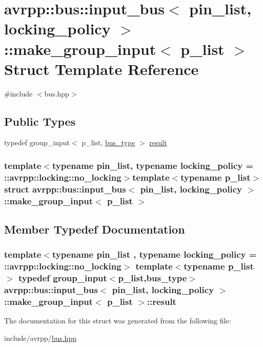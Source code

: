 \hypertarget{structavrpp_1_1bus_1_1input__bus_1_1make__group__input}{
\section{avrpp::bus::input\_\-bus$<$ pin\_\-list, locking\_\-policy $>$::make\_\-group\_\-input$<$ p\_\-list $>$ Struct Template Reference}
\label{structavrpp_1_1bus_1_1input__bus_1_1make__group__input}
}


{\ttfamily \#include $<$bus.hpp$>$}

\subsection*{Public Types}
\begin{DoxyCompactItemize}
\item 
typedef group\_\-input$<$ p\_\-list, \hyperlink{structavrpp_1_1bus_1_1input__bus_aa1146b9861eb713a67224e329e4244a9}{bus\_\-type} $>$ \hyperlink{structavrpp_1_1bus_1_1input__bus_1_1make__group__input_a90aa4faa8b8dcf00d2b176b7f943f260}{result}
\end{DoxyCompactItemize}
\subsubsection*{template$<$typename pin\_\-list, typename locking\_\-policy = ::avrpp::locking::no\_\-locking$>$template$<$typename p\_\-list$>$ struct avrpp::bus::input\_\-bus$<$ pin\_\-list, locking\_\-policy $>$::make\_\-group\_\-input$<$ p\_\-list $>$}



\subsection{Member Typedef Documentation}
\hypertarget{structavrpp_1_1bus_1_1input__bus_1_1make__group__input_a90aa4faa8b8dcf00d2b176b7f943f260}{
\subsubsection[{result}]{\setlength{\rightskip}{0pt plus 5cm}template$<$typename pin\_\-list , typename locking\_\-policy  = ::avrpp::locking::no\_\-locking$>$ template$<$typename p\_\-list $>$ typedef group\_\-input$<$p\_\-list,{\bf bus\_\-type}$>$ {\bf avrpp::bus::input\_\-bus}$<$ pin\_\-list, locking\_\-policy $>$::{\bf make\_\-group\_\-input}$<$ p\_\-list $>$::{\bf result}}}
\label{structavrpp_1_1bus_1_1input__bus_1_1make__group__input_a90aa4faa8b8dcf00d2b176b7f943f260}


The documentation for this struct was generated from the following file:\begin{DoxyCompactItemize}
\item 
include/avrpp/\hyperlink{bus_8hpp}{bus.hpp}\end{DoxyCompactItemize}
